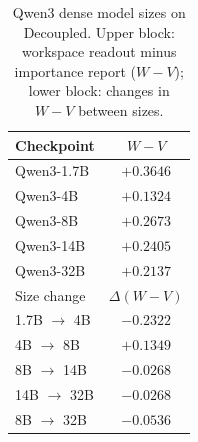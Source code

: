 \begin{table}[t]
\centering
\caption{Qwen3 dense model sizes on Decoupled. Upper block: workspace readout minus importance report
($W{-}V$); lower block: changes in $W{-}V$ between sizes. }
\label{tab:scale}
\small
\setlength{\tabcolsep}{8pt}
\begin{tabular}{lc}
\toprule
Checkpoint & $W{-}V$ \\
\midrule
Qwen3-1.7B & $+0.3646$ \\
Qwen3-4B & $+0.1324$ \\
Qwen3-8B & $+0.2673$ \\
Qwen3-14B & $+0.2405$ \\
Qwen3-32B & $+0.2137$ \\
\midrule
Size change & $\Delta(W{-}V)$ \\
\midrule
1.7B $\rightarrow$ 4B & $-0.2322$ \\
4B $\rightarrow$ 8B & $+0.1349$ \\
8B $\rightarrow$ 14B & $-0.0268$ \\
14B $\rightarrow$ 32B & $-0.0268$ \\
8B $\rightarrow$ 32B & $-0.0536$ \\
\bottomrule
\end{tabular}
\end{table}
